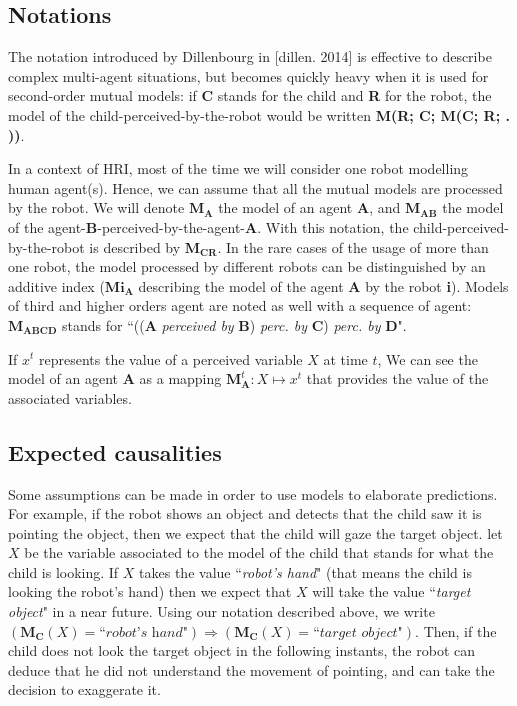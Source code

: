 \documentclass[10pt,a4paper,twocolumn]{article}
\begin{document}
\subsection{Notations}

The notation introduced by Dillenbourg in [dillen. 2014] is effective to describe complex multi-agent situations, but becomes quickly heavy when it is used for second-order mutual models: if \textbf{C} stands for the child and \textbf{R} for the robot, the model of the child-perceived-by-the-robot would be written \textbf{M(R; C; M(C; R; . ))}.

In a context of HRI, most of the time we will consider one robot modelling human agent(s). Hence, we can assume that all the mutual models are processed by the robot. We will denote $\textbf{M}_\textbf{A}$ the model of an agent $\textbf{A}$, and $\textbf{M}_\textbf{AB}$ the model of the agent-\textbf{B}-perceived-by-the-agent-\textbf{A}. With this notation, the child-perceived-by-the-robot is described by $\textbf{M}_\textbf{CR}$. In the rare cases of the usage of more than one robot, the model processed by different robots can be distinguished by an additive index ($\textbf{Mi}_\textbf{A}$ describing the model of the agent \textbf{A} by the robot \textbf{i}). Models of third and higher orders agent are noted as well with a sequence of agent: $\textbf{M}_\textbf{ABCD}$ stands for ``((\textbf{A} \textit{perceived by} \textbf{B}) \textit{perc. by} \textbf{C}) \textit{perc. by} \textbf{D}".

If $x^t$ represents the value of a perceived variable $X$ at time $t$, We can see the model of an agent \textbf{A} as a mapping $\textbf{M}^t_\textbf{A}: X \mapsto x^t$ that provides the value of the associated variables. 

\subsection{Expected causalities}

Some assumptions can be made in order to use models to elaborate predictions. For example, if the robot shows an object and detects that the child saw it is pointing the object, then we expect that the child will gaze the target object.  let $X$ be the variable associated to the model of the child that stands for what the child is looking. If $X$ takes the value ``\textit{robot's hand}" (that means the child is looking the robot's hand) then we expect that $X$ will take the value ``\textit{target object}" in a near future. Using our notation described above, we write $(\textbf{M}_\textbf{C}(X)=\textit{``robot's hand"}) \Rightarrow (\textbf{M}_\textbf{C}(X)=\textit{``target object"})$. Then, if the child does not look the target object in the following instants, the robot can deduce that he did not understand the movement of pointing, and can take the decision to exaggerate it.
\end{document}
